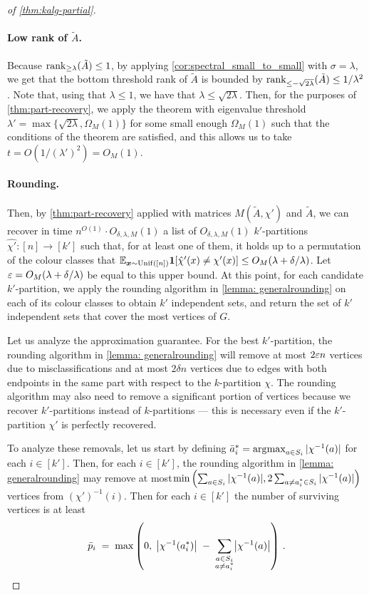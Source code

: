 \begin{proof}[of \cref{thm:kalg-partial}]
    \paragraph{Low rank of $\tilde{A}$.}
    Because $\operatorname{rank}_{\geq \lambda}(\tilde{A}) \leq 1$, by applying \cref{cor:spectral_small_to_small} with $\sigma=\lambda$, we get that the bottom threshold rank of $\tilde{A}$ is bounded by $\operatorname{rank}_{\leq -\sqrt{2\lambda}}(\tilde{A}) \leq 1/\lambda^2$.
    Note that, using that $\lambda \leq 1$, we have that $\lambda \leq \sqrt{2 \lambda}$.
    Then, for the purposes of \cref{thm:part-recovery}, we apply the theorem with eigenvalue threshold $\lambda' = \max\{\sqrt{2\lambda}, \Omega_M(1)\}$ for some small enough $\Omega_M(1)$ such that the conditions of the theorem are satisfied, and this allows us to take $t = O(1/(\lambda')^2) = O_M(1)$.

    \paragraph{Rounding.}
    Then, by \cref{thm:part-recovery} applied with matrices $M(\tilde{A}, \chi')$ and $\tilde{A}$, we can recover in time $n^{O(1)} \cdot O_{\delta,\lambda,M}(1)$ a list of $O_{\delta,\lambda,M}(1)$ $k'$-partitions $\hat{\chi'}: [n] \to [k']$ such that, for at least one of them, it holds up to a permutation of the colour classes that $\mathbb{E}_{\bm{x} \sim \operatorname{Unif}([n])} \mathbf{1}[\hat\chi'(x) \neq \chi'(x)] \leq O_M(\lambda+\delta/\lambda)$.
    Let $\varepsilon = O_M(\lambda + \delta/\lambda)$ be equal to this upper bound.
    At this point, for each candidate $k'$-partition, we apply the rounding algorithm in \cref{lemma: generalrounding} on each of its colour classes to obtain $k'$ independent sets, and return the set of $k'$ independent sets that cover the most vertices of $G$.

    Let us analyze the approximation guarantee.
    For the best $k'$-partition, the rounding algorithm in \cref{lemma: generalrounding} will remove at most $2\varepsilon n$ vertices due to misclassifications and at most $2\delta n$ vertices due to edges with both endpoints in the same part with respect to the $k$-partition $\chi$.
    The rounding algorithm may also need to remove a significant portion of vertices because we recover $k'$-partitions instead of $k$-partitions --- this is necessary even if the $k'$-partition $\chi'$ is perfectly recovered.

    To analyze these removals, let us start by defining $\bar{a}_i^* = \operatorname*{\arg\!\max}_{a \in S_i} |\chi^{-1}(a)|$ for each $i \in [k']$.
    Then, for each $i \in [k']$, the rounding algorithm in \cref{lemma: generalrounding} may remove at most\linebreak $\min\left(\sum_{a \in S_i} |\chi^{-1}(a)|, 2\sum_{\substack{a \neq a_i^{*} \in S_i}} |\chi^{-1}(a)|\right)$ vertices from $(\chi')^{-1}(i)$.
    Then for each \(i\in[k']\) the number of surviving vertices is at least
    \[
    \bar p_i \;=\;
    \max\left(
        0,
        \;\bigl|\chi^{-1}(a_i^*)\bigr|
        \;-\;\sum_{\substack{a\in S_i\\a\neq a_i^*}}
            \bigl|\chi^{-1}(a)\bigr|
    \right)\,.
    \]


\end{proof}
